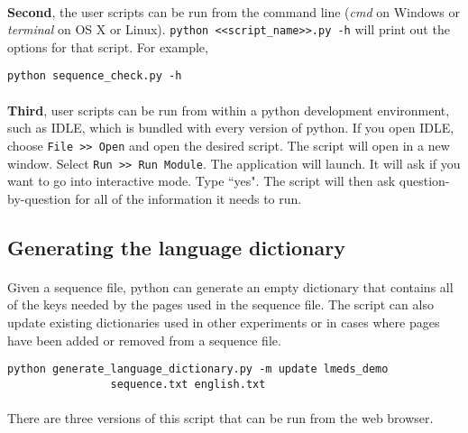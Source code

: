 \paragraph{}
\textbf{Second}, the user scripts can be run from the command line (\textit{cmd} on Windows or \textit{terminal} on OS X or Linux).  \texttt{python <<script\_name>>.py -h} will print out the options for that script.  For example, 
\begin{lstlisting}
python sequence_check.py -h
\end{lstlisting}

\paragraph{}
\textbf{Third}, user scripts can be run from within a python development environment, such as IDLE, which is bundled with every version of python.  If you open IDLE, choose \texttt{File >> Open} and open the desired script.  The script will open in a new window.  Select \texttt{Run >> Run Module}.  The application will launch.  It will ask if you want to go into interactive mode.  Type ``yes".  The script will then ask question-by-question for all of the information it needs to run.


\subsection{Generating the language dictionary}

\paragraph{}
Given a sequence file, python can generate an empty dictionary that contains all of the keys needed by the pages used in the sequence file.  The script can also update existing dictionaries used in other experiments or in cases where pages have been added or removed from a sequence file.

\begin{lstlisting}
python generate_language_dictionary.py -m update lmeds_demo 
				sequence.txt english.txt
\end{lstlisting}

\paragraph{}
There are three versions of this script that can be run from the web browser.

